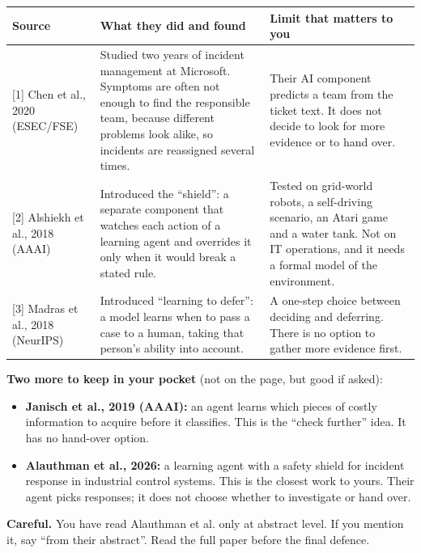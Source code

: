 \documentclass[10pt,a4paper]{article}
\newcommand{\sub}[1]{\par\vspace{4pt}{\bfseries\fontsize{10.6}{13}\selectfont #1}\par}
\newcommand{\caution}[1]{\par\colorbox{warnsoft}{\parbox{\dimexpr\linewidth-2\fboxsep}{\textbf{\color{warn}Careful.} #1}}\par}
\begin{document}
\sub{4.2 The three references}
\begin{tabularx}{\linewidth}{@{}p{3.3cm}LL@{}}
\toprule
\textbf{Source} & \textbf{What they did and found} & \textbf{Limit that matters to you} \\
\midrule
{[1]} Chen et al., 2020 (ESEC/FSE) & Studied two years of incident management at Microsoft. Symptoms are often not enough to find the responsible team, because different problems look alike, so incidents are reassigned several times. & Their AI component predicts a team from the ticket text. It does not decide to look for more evidence or to hand over. \\
\addlinespace
{[2]} Alshiekh et al., 2018 (AAAI) & Introduced the ``shield'': a separate component that watches each action of a learning agent and overrides it only when it would break a stated rule. & Tested on grid-world robots, a self-driving scenario, an Atari game and a water tank. Not on IT operations, and it needs a formal model of the environment. \\
\addlinespace
{[3]} Madras et al., 2018 (NeurIPS) & Introduced ``learning to defer'': a model learns when to pass a case to a human, taking that person's ability into account. & A one-step choice between deciding and deferring. There is no option to gather more evidence first. \\
\bottomrule
\end{tabularx}

\textbf{Two more to keep in your pocket} (not on the page, but good if asked):
\begin{itemize}
  \item \textbf{Janisch et al., 2019 (AAAI):} an agent learns which pieces of costly information to acquire before it classifies. This is the ``check further'' idea. It has no hand-over option.
  \item \textbf{Alauthman et al., 2026:} a learning agent with a safety shield for incident response in industrial control systems. This is the closest work to yours. Their agent picks responses; it does not choose whether to investigate or hand over.
\end{itemize}
\caution{You have read Alauthman et al. only at abstract level. If you mention it, say ``from their abstract''. Read the full paper before the final defence.}
\end{document}
